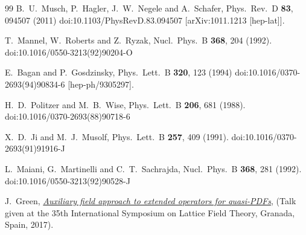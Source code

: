 \begin{thebibliography}{99}
  B.~U.~Musch, P.~Hagler, J.~W.~Negele and A.~Schafer,
  Phys.\ Rev.\ D {\bf 83}, 094507 (2011)
  doi:10.1103/PhysRevD.83.094507
  [arXiv:1011.1213 [hep-lat]].



  T.~Mannel, W.~Roberts and Z.~Ryzak,
  Nucl.\ Phys.\ B {\bf 368}, 204 (1992).
  doi:10.1016/0550-3213(92)90204-O


  E.~Bagan and P.~Gosdzinsky,
  Phys.\ Lett.\ B {\bf 320}, 123 (1994)
  doi:10.1016/0370-2693(94)90834-6
  [hep-ph/9305297].

  H.~D.~Politzer and M.~B.~Wise,
  Phys.\ Lett.\ B {\bf 206}, 681 (1988).
  doi:10.1016/0370-2693(88)90718-6



  X.~D.~Ji and M.~J.~Musolf,
  Phys.\ Lett.\ B {\bf 257}, 409 (1991).
  doi:10.1016/0370-2693(91)91916-J


  L.~Maiani, G.~Martinelli and C.~T.~Sachrajda,
  Nucl.\ Phys.\ B {\bf 368}, 281 (1992).
  doi:10.1016/0550-3213(92)90528-J


  J.~Green,
  {\href{https://makondo.ugr.es/event/0/session/95/contribution/332/material/slides/0.pdf}{\it Auxiliary field approach to extended operators for quasi-PDFs}},
  (Talk given at the 35th International Symposium on Lattice Field Theory, Granada, Spain, 2017).


\end{thebibliography}
